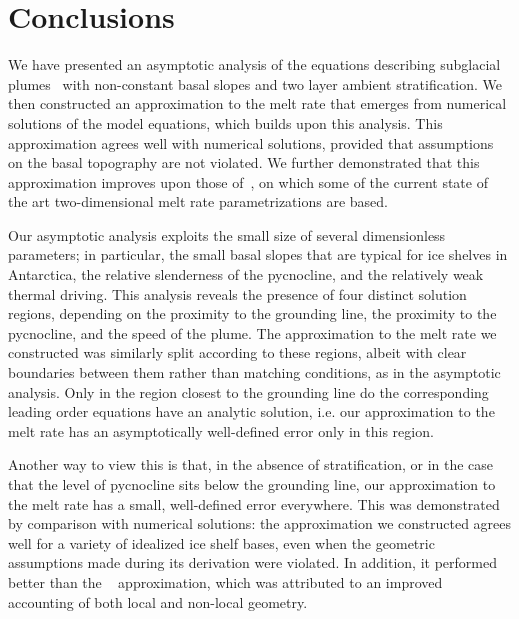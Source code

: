 \documentclass[openacc]{rsproca_new}%
\begin{document}
\section{Conclusions}\label{S:Discussion}
We have presented an asymptotic analysis of the equations describing subglacial plumes~\cite{Jenkins1991JGeophysResOceans, Jenkins2011JPhysOcean} with non-constant basal slopes and two layer ambient stratification. We then constructed an approximation to the melt rate that emerges from numerical solutions of the model equations, which builds upon this analysis. This approximation agrees well with numerical solutions, provided that assumptions on the basal topography are not violated. We further demonstrated that this approximation improves upon those of~\citet{Lazeroms2019JPhysOcean}, on which some of the current state of the art two-dimensional melt rate parametrizations are based.

Our asymptotic analysis exploits the small size of several dimensionless parameters; in particular, the small basal slopes that are typical for ice shelves in Antarctica, the relative slenderness of the pycnocline, and the relatively weak thermal driving. This analysis reveals the presence of four distinct solution regions, depending on the proximity to the grounding line, the proximity to the pycnocline, and the speed of the plume. The approximation to the melt rate we constructed was similarly split according to these regions, albeit with clear boundaries between them rather than matching conditions, as in the asymptotic analysis. Only in the region closest to the grounding line do the corresponding leading order equations have an analytic solution, i.e. our approximation to the melt rate has an asymptotically well-defined error only in this region. 

Another way to view this is that, in the absence of stratification, or in the case that the level of pycnocline sits below the grounding line, our approximation to the melt rate has a small, well-defined error everywhere.  This was demonstrated by comparison with numerical solutions: the approximation we constructed agrees well for a variety of idealized ice shelf bases, even when the geometric assumptions made during its derivation were violated. In addition, it performed better than the ~\citet{Lazeroms2019JPhysOcean} approximation, which was attributed to an improved accounting of both local and non-local geometry.
\end{document}
